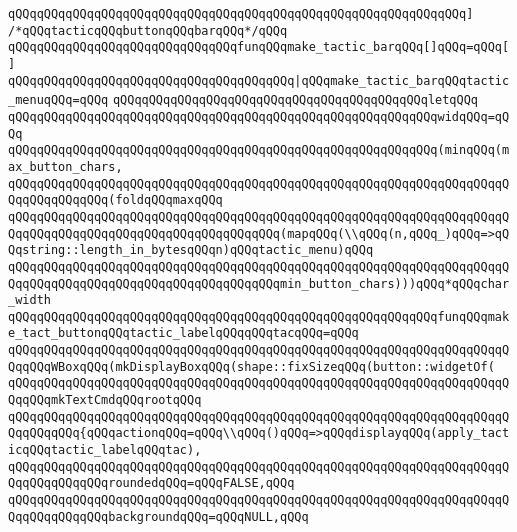 \verb|qQQqqQQqqQQqqQQqqQQqqQQqqQQqqQQqqQQqqQQqqQQqqQQqqQQqqQQqqQQqqQQq]|\newline
\newline
\verb|/*qQQqtacticqQQqbuttonqQQqbarqQQq*/qQQq|\newline
\verb|qQQqqQQqqQQqqQQqqQQqqQQqqQQqqQQqfunqQQqmake_tactic_barqQQq[]qQQq=qQQq[]|\newline
\verb|qQQqqQQqqQQqqQQqqQQqqQQqqQQqqQQqqQQqqQQq|\verb#|qQQqmake_tactic_barqQQqtactic_menuqQQq=qQQq#\newline
\verb|qQQqqQQqqQQqqQQqqQQqqQQqqQQqqQQqqQQqqQQqqQQqletqQQq|\newline
\verb|qQQqqQQqqQQqqQQqqQQqqQQqqQQqqQQqqQQqqQQqqQQqqQQqqQQqqQQqqQQqwidqQQq=qQQq|\newline
\verb|qQQqqQQqqQQqqQQqqQQqqQQqqQQqqQQqqQQqqQQqqQQqqQQqqQQqqQQqqQQq(minqQQq(max_button_chars,|\newline
\verb|qQQqqQQqqQQqqQQqqQQqqQQqqQQqqQQqqQQqqQQqqQQqqQQqqQQqqQQqqQQqqQQqqQQqqQQqqQQqqQQqqQQq(foldqQQqmaxqQQq|\newline
\verb|qQQqqQQqqQQqqQQqqQQqqQQqqQQqqQQqqQQqqQQqqQQqqQQqqQQqqQQqqQQqqQQqqQQqqQQqqQQqqQQqqQQqqQQqqQQqqQQqqQQqqQQqqQQq(mapqQQq(\\qQQq(n,qQQq_)qQQq=>qQQqstring::length_in_bytesqQQqn)qQQqtactic_menu)qQQq|\newline
\verb|qQQqqQQqqQQqqQQqqQQqqQQqqQQqqQQqqQQqqQQqqQQqqQQqqQQqqQQqqQQqqQQqqQQqqQQqqQQqqQQqqQQqqQQqqQQqqQQqqQQqqQQqqQQqmin_button_chars)))qQQq*qQQqchar_width|\newline
\verb|qQQqqQQqqQQqqQQqqQQqqQQqqQQqqQQqqQQqqQQqqQQqqQQqqQQqqQQqqQQqfunqQQqmake_tact_buttonqQQqtactic_labelqQQqqQQqtacqQQq=qQQq|\newline
\verb|qQQqqQQqqQQqqQQqqQQqqQQqqQQqqQQqqQQqqQQqqQQqqQQqqQQqqQQqqQQqqQQqqQQqqQQqqQQqWBoxqQQq(mkDisplayBoxqQQq(shape::fixSizeqQQq(button::widgetOf(|\newline
\verb|qQQqqQQqqQQqqQQqqQQqqQQqqQQqqQQqqQQqqQQqqQQqqQQqqQQqqQQqqQQqqQQqqQQqqQQqqQQqmkTextCmdqQQqrootqQQq|\newline
\verb|qQQqqQQqqQQqqQQqqQQqqQQqqQQqqQQqqQQqqQQqqQQqqQQqqQQqqQQqqQQqqQQqqQQqqQQqqQQqqQQq{qQQqactionqQQq=qQQq\\qQQq()qQQq=>qQQqdisplayqQQq(apply_tacticqQQqtactic_labelqQQqtac),|\newline
\verb|qQQqqQQqqQQqqQQqqQQqqQQqqQQqqQQqqQQqqQQqqQQqqQQqqQQqqQQqqQQqqQQqqQQqqQQqqQQqqQQqqQQqroundedqQQq=qQQqFALSE,qQQq|\newline
\verb|qQQqqQQqqQQqqQQqqQQqqQQqqQQqqQQqqQQqqQQqqQQqqQQqqQQqqQQqqQQqqQQqqQQqqQQqqQQqqQQqqQQqbackgroundqQQq=qQQqNULL,qQQq|\newline
